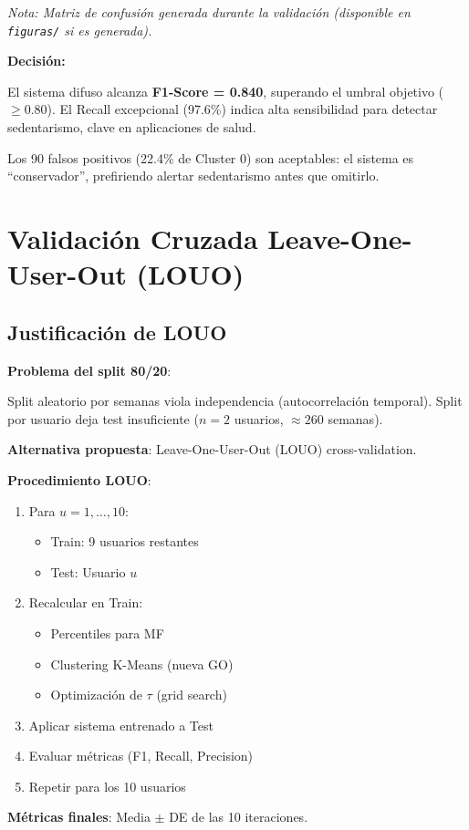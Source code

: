 \documentclass[12pt,letterpaper,twoside]{report}
\begin{document}
\textit{Nota: Matriz de confusión generada durante la validación (disponible en \texttt{figuras/} si es generada).}

\begin{decisionbox}
\textbf{Decisión:}

El sistema difuso alcanza \textbf{F1-Score = 0.840}, superando el umbral objetivo ($\geq 0.80$). El Recall excepcional (97.6\%) indica alta sensibilidad para detectar sedentarismo, clave en aplicaciones de salud.

Los 90 falsos positivos (22.4\% de Cluster 0) son aceptables: el sistema es ``conservador'', prefiriendo alertar sedentarismo antes que omitirlo.
\end{decisionbox}

\section{Validación Cruzada Leave-One-User-Out (LOUO)}

\subsection{Justificación de LOUO}

\begin{hipotesisbox}
\textbf{Problema del split 80/20}:

Split aleatorio por semanas viola independencia (autocorrelación temporal). Split por usuario deja test insuficiente ($n=2$ usuarios, $\approx 260$ semanas).

\textbf{Alternativa propuesta}: Leave-One-User-Out (LOUO) cross-validation.
\end{hipotesisbox}

\begin{estadisticobox}
\textbf{Procedimiento LOUO}:

\begin{enumerate}[noitemsep]
    \item Para $u = 1, \ldots, 10$:
    \begin{itemize}[noitemsep]
        \item Train: 9 usuarios restantes
        \item Test: Usuario $u$
    \end{itemize}
    \item Recalcular en Train:
    \begin{itemize}[noitemsep]
        \item Percentiles para MF
        \item Clustering K-Means (nueva GO)
        \item Optimización de $\tau$ (grid search)
    \end{itemize}
    \item Aplicar sistema entrenado a Test
    \item Evaluar métricas (F1, Recall, Precision)
    \item Repetir para los 10 usuarios
\end{enumerate}

\textbf{Métricas finales}: Media $\pm$ DE de las 10 iteraciones.
\end{estadisticobox}
\end{document}

